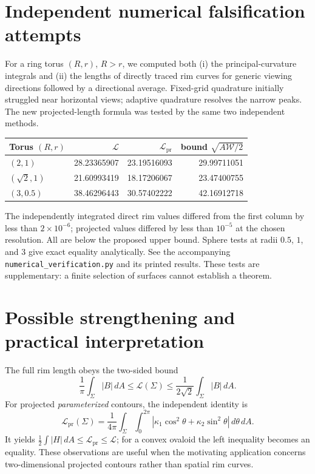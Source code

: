 \documentclass[11pt,a4paper]{article}
\begin{document}
\section*{Independent numerical falsification attempts}
For a ring torus $(R,r)$, $R>r$, we computed both (i) the principal-curvature integrals and (ii) the lengths of directly traced rim curves for generic viewing directions followed by a directional average. Fixed-grid quadrature initially struggled near horizontal views; adaptive quadrature resolves the narrow peaks. The new projected-length formula was tested by the same two independent methods.
\begin{center}\small
\begin{tabular}{@{}lrrr@{}}\toprule
Torus $(R,r)$ & $\mathcal L$ & $\mathcal L_{\mathrm{pr}}$ & bound $\sqrt{A\mathcal W/2}$\\\midrule
$(2,1)$ & 28.23365907 & 23.19516093 & 29.99711051\\
$(\sqrt{2},1)$ & 21.60993419 & 18.17206067 & 23.47400755\\
$(3,0.5)$ & 38.46296443 & 30.57402222 & 42.16912718\\\bottomrule
\end{tabular}
\end{center}
The independently integrated direct rim values differed from the first column by less than $2\times10^{-6}$; projected values differed by less than $10^{-5}$ at the chosen resolution. All are below the proposed upper bound. Sphere tests at radii $0.5$, $1$, and $3$ give exact equality analytically. See the accompanying \texttt{numerical\_verification.py} and its printed results. These tests are supplementary: a finite selection of surfaces cannot establish a theorem.

\section*{Possible strengthening and practical interpretation}
The full rim length obeys the two-sided bound
\[
\frac1\pi\int_\Sigma |B|\,dA\leq\mathcal L(\Sigma)\leq
\frac1{2\sqrt2}\int_\Sigma |B|\,dA.
\]
For projected \emph{parameterized} contours, the independent identity is
\[
\mathcal L_{\mathrm{pr}}(\Sigma)=\frac1{4\pi}\int_\Sigma\int_0^{2\pi}
|\kappa_1\cos^2\theta+\kappa_2\sin^2\theta|\,d\theta\,dA.
\]
It yields $\frac12\int|H|\,dA\leq\mathcal L_{\mathrm{pr}}\leq\mathcal L$; for a convex ovaloid the left inequality becomes an equality. These observations are useful when the motivating application concerns two-dimensional projected contours rather than spatial rim curves.
\end{document}
